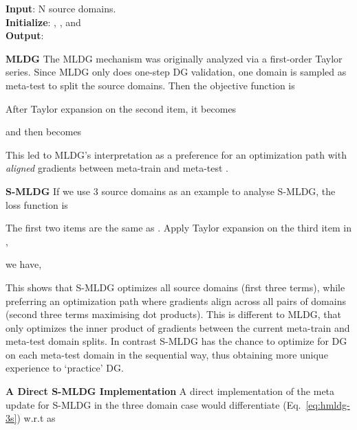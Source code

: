 \documentclass[runningheads]{llncs}
\newcommand{\nameS}{S-MLDG}
\newcommand{\keypoint}[1]{\vspace{0.1cm}\noindent\textbf{#1}\quad}
\begin{document}
\begin{algorithm}[t]
\SetAlgoLined
\textbf{Input}:  N source domains.\\
\textbf{Initialize}: , ,  and \\
\textbf{Output}: 
 \caption{Faster First-Order \nameS{}}
 \label{alg:reptile-dg}
\end{algorithm}
\keypoint{MLDG}
The MLDG mechanism was originally analyzed \cite{Li2018MLDG} via a first-order Taylor series. Since MLDG only does one-step DG validation, one domain is sampled as meta-test to split the source domains. Then the objective function is

\small

\normalsize
After Taylor expansion on the second item, it  becomes
\small

\normalsize
and then  becomes
\small

\normalsize
\noindent This led to MLDG's interpretation as a preference for an optimization path with \emph{aligned} gradients between meta-train and meta-test \cite{Li2018MLDG}.

\keypoint{\nameS{}}
If we use 3 source domains as an example to analyse \nameS{}, the loss function is
\small

\normalsize
The first two items are the same as . Apply Taylor expansion on the third item in ,

we have,
\small

\normalsize
This shows that \nameS{} optimizes all source domains (first three terms), while preferring an optimization path where gradients align across all pairs of domains (second three terms maximising dot products). This is different to MLDG, that only optimizes the inner product of gradients between the current  meta-train and meta-test domain splits. In contrast \nameS{} has the chance to optimize for DG on each meta-test domain in the sequential way, thus obtaining more unique experience to `practice' DG.



\keypoint{A Direct \nameS{} Implementation}
A direct implementation of the meta update for \nameS{} in the three domain case would differentiate  (Eq.~\ref{eq:hmldg-3s}) w.r.t  as
\small
\end{document}
